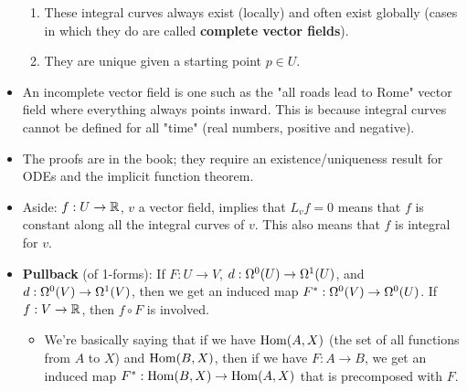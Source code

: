 \documentclass[../notes.tex]{subfiles}
\begin{document}
\begin{itemize}
    \begin{enumerate}
        \item These integral curves always exist (locally) and often exist globally (cases in which they do are called \textbf{complete vector fields}).
        \item They are unique given a starting point $p\in U$.
    \end{enumerate}
    \item An incomplete vector field is one such as the "all roads lead to Rome" vector field where everything always points inward. This is because integral curves cannot be defined for all "time" (real numbers, positive and negative).
    \item The proofs are in the book; they require an existence/uniqueness result for ODEs and the implicit function theorem.
    \item Aside: $f:U\to\R$, $v$ a vector field, implies that $L_vf=0$ means that $f$ is constant along all the integral curves of $v$. This also means that $f$ is integral for $v$.
    \item \textbf{Pullback} (of 1-forms): If $F:U\to V$, $d:\ome[0]{U}\to\ome[1]{U}$, and $d:\ome[0]{V}\to\ome[1]{V}$, then we get an induced map $F^*:\ome[0]{V}\to\ome[0]{U}$. If $f:V\to\R$, then $f\circ F$ is involved.
    \begin{itemize}
        \item We're basically saying that if we have $\Hom(A,X)$ (the set of all functions from $A$ to $X$) and $\Hom(B,X)$, then if we have $F:A\to B$, we get an induced map $F^*:\Hom(B,X)\to\Hom(A,X)$ that is precomposed with $F$.
    \end{itemize}
\end{itemize}
\end{document}
